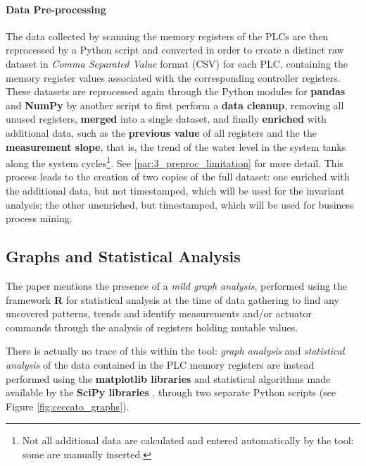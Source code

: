 \paragraph{Data Pre-processing}
\label{par:3_preproc} 
The data collected by scanning the memory registers of the PLCs are then reprocessed by a Python script and converted in order to create a distinct raw dataset in \textit{Comma Separated Value} format (CSV) for each PLC, containing the memory register values associated with the corresponding controller registers. These datasets are reprocessed again through the Python modules for \textbf{pandas} \cite{pandas} and \textbf{NumPy} \cite{numpy} by another script to first perform a \textbf{data cleanup}, removing all unused registers, \textbf{merged} into a single dataset, and finally \textbf{enriched} with additional data, such as the \textbf{previous value} of all registers and the the \textbf{measurement slope}, that is, the trend of the water level in the system tanks along the system cycles\footnote{Not all additional data are calculated and entered automatically by the tool: some are manually inserted.}. See \ref{par:3_preproc_limitation} for more detail.\newline \newline
This process leads to the creation of two copies of the full dataset: one enriched with the additional data, but not timestamped, which will be used for the invariant analysis; the other unenriched, but timestamped, which will be used for business process mining.

\subsection{Graphs and Statistical Analysis}
\label{subsec:3_graph_analysis}
The paper mentions the presence of a \textit{mild graph analysis}, performed using the framework \textbf{R} \cite{r-project} for statistical analysis at the time of data gathering to find any uncovered patterns, trends and identify measurements and/or actuator commands through the analysis of registers holding mutable values. 

\bigskip
There is actually no trace of this within the tool: \textit{graph analysis} and \textit{statistical analysis} of the data contained in the PLC memory registers are instead performed using the \textbf{matplotlib libraries} and statistical algorithms made available by the \textbf{SciPy libraries} \cite{scipy}, through two separate Python scripts (see Figure \ref{fig:ceccato_graphs}).

